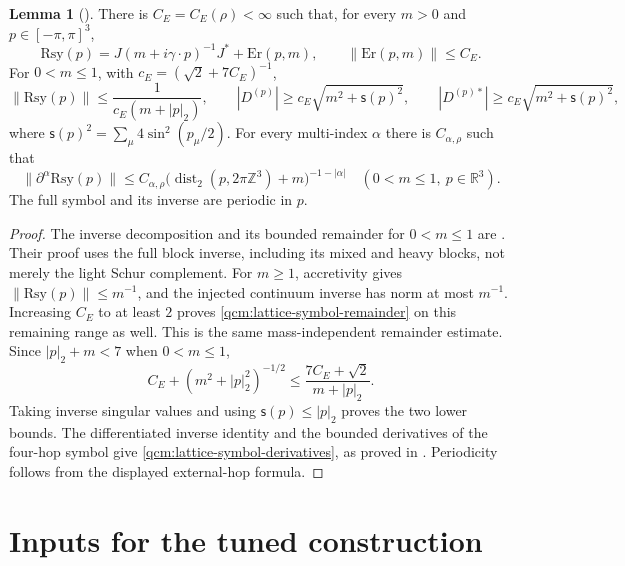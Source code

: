\documentclass[11pt,letterpaper,reqno]{amsart}
\theoremstyle{definition}
\newtheorem{qcmlemma}[qcmproposition]{Lemma}
\newenvironment{lemma}[1][]{\pushQED{\qed}\renewcommand{\qedsymbol}{$\blacksquare$}\begin{qcmlemma}[#1]}{\popQED\end{qcmlemma}}
\begin{document}
\begin{lemma}\label{qcm:lattice-free-symbol}
There is $C_E=C_E(\rho)<\infty$ such that, for every $m>0$ and
$p\in[-\pi,\pi]^3$,
\begin{equation}\label{qcm:lattice-symbol-remainder}
 \mathrm{Rsy}(p)=J(m+i\gamma\cdot p)^{-1}J^*+\mathrm{Er}(p,m),
 \qquad \|\mathrm{Er}(p,m)\|\le C_E.
\end{equation}
For $0<m\le1$, with $c_E=(\sqrt2+7C_E)^{-1}$,
\[
 \|\mathrm{Rsy}(p)\|\le\frac1{c_E(m+|p|_2)},\qquad
 |D^{(p)}|\ge c_E\sqrt{m^2+\mathsf s(p)^2},\qquad
 |D^{(p)*}|\ge c_E\sqrt{m^2+\mathsf s(p)^2},
\]
where $\mathsf s(p)^2=\sum_\mu4\sin^2(p_\mu/2)$.
For every multi-index $\alpha$ there is $C_{\alpha,\rho}$ such that
\begin{equation}\label{qcm:lattice-symbol-derivatives}
 \|\partial^\alpha\mathrm{Rsy}(p)\|
 \le C_{\alpha,\rho}
    \bigl(\operatorname{dist}_2(p,2\pi\mathbb Z^3)+m\bigr)^{-1-|\alpha|}
       \quad(0<m\le1,\ p\in\mathbb R^3).
\end{equation}
The full symbol and its inverse are periodic in $p$.
\end{lemma}

\begin{proof}
The inverse decomposition and its bounded remainder for $0<m\le1$
are \cite[equations~(18.4)--(18.5)]{QEDConstruction}. Their proof
uses the full block inverse, including its mixed and heavy blocks,
not merely the light Schur complement. For $m\ge1$, accretivity
gives $\|\mathrm{Rsy}(p)\|\le m^{-1}$, and the injected continuum
inverse has norm at most $m^{-1}$. Increasing $C_E$ to at least
$2$ proves \eqref{qcm:lattice-symbol-remainder} on this remaining
range as well. This is the same mass-independent remainder estimate.
Since $|p|_2+m<7$ when $0<m\le1$,
\[
 C_E+(m^2+|p|_2^2)^{-1/2}
 \le\frac{7C_E+\sqrt2}{m+|p|_2}.
\]
Taking inverse singular values and using
$\mathsf s(p)\le|p|_2$ proves the two lower bounds.
The differentiated inverse identity and the bounded derivatives of
the four-hop symbol give
\eqref{qcm:lattice-symbol-derivatives}, as proved in
\cite[equations~(18.6)--(18.8)]{QEDConstruction}. Periodicity follows
from the displayed external-hop formula.
\end{proof}


\section{Inputs for the tuned construction}
\label{app:qcm-tuned}
\end{document}
